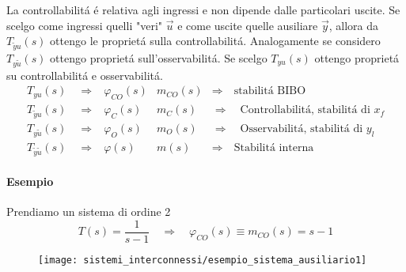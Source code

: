 \documentclass[../main.tex]{subfiles}
\begin{document}
		La controllabilit\'a \'e relativa agli ingressi e non dipende dalle particolari uscite. Se scelgo come ingressi quelli "veri" $ \vec u $ e come uscite quelle ausiliare $ \vec y $, allora da $ T_{\tilde y u}(s) $ ottengo le propriet\'a sulla controllabilit\'a. Analogamente se considero $ T_{y \tilde u}(s) $ ottengo propriet\'a sull'osservabilit\'a. Se scelgo $ T_{yu}(s) $ ottengo propriet\'a su controllabilit\'a e osservabilit\'a.
		\[
			\begin{array}{llll}
				T_{yu}(s) \quad\Rightarrow & \varphi_{CO}(s) & m_{CO}(s) & \Rightarrow\quad \text{stabilit\'a BIBO}
				\\ 
				T_{\tilde y u}(s) \quad\Rightarrow & \varphi_C(s) & m_C(s) & \Rightarrow\quad \text{Controllabilit\'a, stabilit\'a di } x_f
				\\ 
				T_{y \tilde u}(s) \quad\Rightarrow & \varphi_O(s) & m_O(s) & \Rightarrow\quad \text{Osservabilit\'a, stabilit\'a di } y_l
				\\ 
				T_{\tilde y \tilde u}(s) \quad\Rightarrow & \varphi(s) & m(s) & \Rightarrow\quad \text{Stabilit\'a interna}
			\end{array}
		\]
		
		\paragraph{Esempio}
			Prendiamo un sistema di ordine 2
			\[
			T(s) = \dfrac{1}{s-1} \quad\Rightarrow\quad \varphi_{CO}(s) \equiv m_{CO}(s) = s-1
			\]
			\begin{figure}[h!]
				\centering\texttt{[image: sistemi\_interconnessi/esempio\_sistema\_ausiliario1]}
			\end{figure}
			
\end{document}

